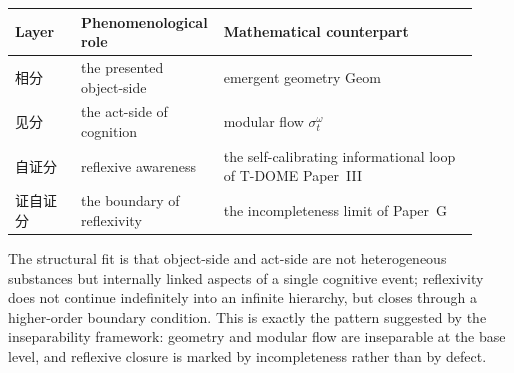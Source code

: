 \documentclass[12pt]{article}
\theoremstyle{definition}
\theoremstyle{remark}
\newcounter{none}
\begin{document}
{\def\LTcaptype{none}
\begin{longtable}{P{0.14\linewidth}P{0.24\linewidth}P{0.54\linewidth}}
\toprule\noalign{}
Layer & Phenomenological role & Mathematical counterpart \\
\midrule\noalign{}
\endhead
\bottomrule\noalign{}
\endlastfoot
相分 & the presented object-side & emergent geometry
\(\mathrm{Geom}\) \\
见分 & the act-side of cognition & modular flow \(\sigma_t^\omega\) \\
自证分 & reflexive awareness & the self-calibrating informational loop
of T-DOME Paper~III~\cite{Liu2026TDOME_III} \\
证自证分 & the boundary of reflexivity & the incompleteness limit of
Paper~G~\cite{Liu2026PaperG} \\
\end{longtable}
}

The structural fit is that object-side and act-side are not heterogeneous
substances but internally linked aspects of a single cognitive event;
reflexivity does not continue indefinitely into an infinite hierarchy,
but closes through a higher-order boundary condition. This is exactly
the pattern suggested by the inseparability framework: geometry and
modular flow are inseparable at the base level, and reflexive closure is
marked by incompleteness rather than by defect.
 
\newpage
{}
\end{document}
